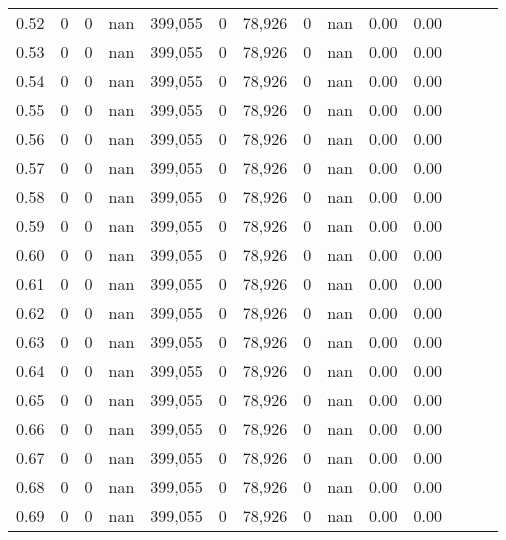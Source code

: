 \begin{tabular}{rrrrrrrrrrrrrr}
0.52 &        0 &       0 &   nan &  399,055 &        0 &  78,926 &       0 &   nan &  0.00 &      0.00 \\
0.53 &        0 &       0 &   nan &  399,055 &        0 &  78,926 &       0 &   nan &  0.00 &      0.00 \\
0.54 &        0 &       0 &   nan &  399,055 &        0 &  78,926 &       0 &   nan &  0.00 &      0.00 \\
0.55 &        0 &       0 &   nan &  399,055 &        0 &  78,926 &       0 &   nan &  0.00 &      0.00 \\
0.56 &        0 &       0 &   nan &  399,055 &        0 &  78,926 &       0 &   nan &  0.00 &      0.00 \\
0.57 &        0 &       0 &   nan &  399,055 &        0 &  78,926 &       0 &   nan &  0.00 &      0.00 \\
0.58 &        0 &       0 &   nan &  399,055 &        0 &  78,926 &       0 &   nan &  0.00 &      0.00 \\
0.59 &        0 &       0 &   nan &  399,055 &        0 &  78,926 &       0 &   nan &  0.00 &      0.00 \\
0.60 &        0 &       0 &   nan &  399,055 &        0 &  78,926 &       0 &   nan &  0.00 &      0.00 \\
0.61 &        0 &       0 &   nan &  399,055 &        0 &  78,926 &       0 &   nan &  0.00 &      0.00 \\
0.62 &        0 &       0 &   nan &  399,055 &        0 &  78,926 &       0 &   nan &  0.00 &      0.00 \\
0.63 &        0 &       0 &   nan &  399,055 &        0 &  78,926 &       0 &   nan &  0.00 &      0.00 \\
0.64 &        0 &       0 &   nan &  399,055 &        0 &  78,926 &       0 &   nan &  0.00 &      0.00 \\
0.65 &        0 &       0 &   nan &  399,055 &        0 &  78,926 &       0 &   nan &  0.00 &      0.00 \\
0.66 &        0 &       0 &   nan &  399,055 &        0 &  78,926 &       0 &   nan &  0.00 &      0.00 \\
0.67 &        0 &       0 &   nan &  399,055 &        0 &  78,926 &       0 &   nan &  0.00 &      0.00 \\
0.68 &        0 &       0 &   nan &  399,055 &        0 &  78,926 &       0 &   nan &  0.00 &      0.00 \\
0.69 &        0 &       0 &   nan &  399,055 &        0 &  78,926 &       0 &   nan &  0.00 &      0.00 \\

\end{tabular}
